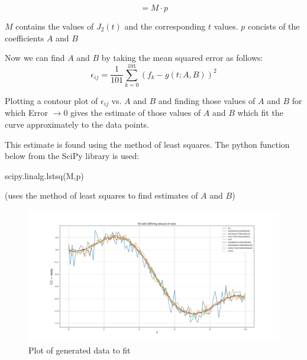 \documentclass[12pt, a4paper]{report}
\begin{document}
\begin{description}[font=$\bullet$]
\begin{equation}
=M\cdot p
\end{equation}
\item $M$ contains the values of $J_2(t)$ and the corresponding $t$ values. $p$ concists of the coefficients $A$ and $B$
\item Now we can find $A$ and $B$ by taking the mean squared error as follows:
\begin{equation}
\epsilon_{ij}=\frac{1}{101}\sum_{k=0}^{101}\left(f_{k}-g(t;A,B)\right)^{2}
\end{equation} 
\item Plotting a contour plot of $\epsilon_{ij}$ vs. $A$ and $B$ and finding those values of $A$ and $B$ for which Error $ \longrightarrow 0$ gives the estimate of those values of $A$ and $B$ which fit the curve approximately to the data points.
\item This estimate is found using the method of least squares. The python function below from the SciPy library is used:
\begin{psudo}
scipy.linalg.lstsq(M,p)
\end{psudo}
(uses the method of least squares to find estimates of $A$ and $B$)
\begin{figure}[H]
	\includegraphics[scale=0.35]{Figure_1.png} 
	\caption{Plot of generated data to fit}
	\label{fig:rawdata}
\end{figure}
\end{description}
\end{document}
